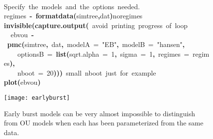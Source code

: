 \documentclass{elsarticle}
\makeatletter
\newcommand{\hlnumber}[1]{\textcolor[rgb]{0,0,0}{#1}}%
\newcommand{\hlfunctioncall}[1]{\textcolor[rgb]{.5,0,.33}{\textbf{#1}}}%
\newcommand{\hlstring}[1]{\textcolor[rgb]{.6,.6,1}{#1}}%
\newcommand{\hlkeyword}[1]{\textbf{#1}}%
\newcommand{\hlargument}[1]{\textcolor[rgb]{.69,.25,.02}{#1}}%
\newcommand{\hlcomment}[1]{\textcolor[rgb]{.18,.6,.34}{#1}}%
\newcommand{\hlassignement}[1]{\textbf{#1}}%
\newcommand{\hlsymbol}[1]{#1}%
\newcommand{\hlstd}[1]{\textcolor[rgb]{0,0,0}{#1}}%
\newenvironment{kframe}{%
 \def\FrameCommand##1{\hskip\@totalleftmargin \hskip-\fboxsep
 \colorbox{shadecolor}{##1}\hskip-\fboxsep
     \hskip-\linewidth \hskip-\@totalleftmargin \hskip\columnwidth}%
 \MakeFramed {\advance\hsize-\width
   \@totalleftmargin\z@ \linewidth\hsize
   \@setminipage}}%
 {\par\unskip\endMakeFramed}
\newenvironment{knitrout}{}{} %
\makeatother
\begin{document}
\begin{figure}
\begin{knitrout}
{\begin{kframe}
\begin{flushleft}
\hlstd{}\hspace*{\fill}\\
\hlstd{}\hlcomment{\usebox{\hlnormalsizeboxhash}{\ }Specify{\ }the{\ }models{\ }and{\ }the{\ }options{\ }needed.{\ }{\ }}\hspace*{\fill}\\
\hlstd{}\hlsymbol{regimes}{\ }\hlassignement{\usebox{\hlnormalsizeboxlessthan}-}{\ }\hlfunctioncall{format\usebox{\hlnormalsizeboxunderscore}data}\hlkeyword{(}\hlsymbol{simtree}\hlkeyword{,}\hlsymbol{dat}\hlkeyword{)}\hlkeyword{\usebox{\hlnormalsizeboxdollar}}\hlsymbol{noregimes}\hspace*{\fill}\\
\hlstd{}\hlfunctioncall{invisible}\hlkeyword{(}\hlfunctioncall{capture.output}\hlkeyword{(}{\ }\hlcomment{\usebox{\hlnormalsizeboxhash}{\ }avoid{\ }printing{\ }progress{\ }of{\ }loop}\hspace*{\fill}\\
\hlstd{}{\ }{\ }\hlsymbol{eb\usebox{\hlnormalsizeboxunderscore}v\usebox{\hlnormalsizeboxunderscore}ou}{\ }\hlassignement{\usebox{\hlnormalsizeboxlessthan}-}{\ }\hlfunctioncall{pmc}\hlkeyword{(}\hlsymbol{simtree}\hlkeyword{,}{\ }\hlsymbol{dat}\hlkeyword{,}{\ }\hlargument{modelA}{\ }\hlargument{=}{\ }\hlstring{"{}EB"{}}\hlkeyword{,}{\ }\hlargument{modelB}{\ }\hlargument{=}{\ }\hlstring{"{}hansen"{}}\hlkeyword{,}\hspace*{\fill}\\
\hlstd{}{\ }{\ }{\ }{\ }\hlargument{optionsB}{\ }\hlargument{=}{\ }\hlfunctioncall{list}\hlkeyword{(}\hlargument{sqrt.alpha}{\ }\hlargument{=}{\ }\hlnumber{1}\hlkeyword{,}{\ }\hlargument{sigma}{\ }\hlargument{=}{\ }\hlnumber{1}\hlkeyword{,}{\ }\hlargument{regimes}{\ }\hlargument{=}{\ }\hlsymbol{regimes}\hlkeyword{)}\hlkeyword{,}\hspace*{\fill}\\
\hlstd{}{\ }{\ }{\ }{\ }\hlargument{nboot}{\ }\hlargument{=}{\ }\hlnumber{20}\hlkeyword{)}\hlkeyword{)}\hlkeyword{)}{\ }\hlcomment{\usebox{\hlnormalsizeboxhash}{\ }small{\ }nboot{\ }just{\ }for{\ }example}\hspace*{\fill}\\
\hlstd{}\hlfunctioncall{plot}\hlkeyword{(}\hlsymbol{eb\usebox{\hlnormalsizeboxunderscore}v\usebox{\hlnormalsizeboxunderscore}ou}\hlkeyword{)}\mbox{}
\normalfont
\end{flushleft}


\centering{}\texttt{[image: earlyburst]} 

\end{kframe}}
\end{knitrout}

\caption{Early burst models can be very almost impossible to distinguish from OU models when each has been parameterized from the same data.}\label{fig:eb}
\end{figure}
\end{document}
